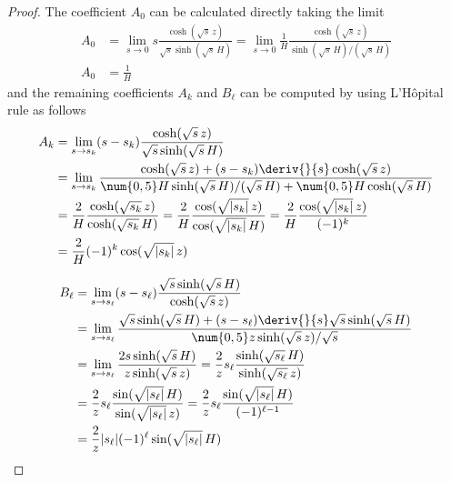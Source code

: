 \begin{proof}
	The coefficient $A_{0}$ can be calculated directly taking the limit
	\begin{subequations}
		\begin{align}
			A_{0} &= \lim_{s \to 0} s
			\frac{
				\cosh(\sqrt{s}\, z)
			}{
				\sqrt{s} \sinh(\sqrt{s}\, H)
			}
			= \lim_{s \to 0} \frac{1}{H}
			\frac{
				\cosh(\sqrt{s}\, z)
			}{
				\sinh(\sqrt{s}\, H)/(\sqrt{s}\, H)
			}
			\\
			A_{0} &= \frac{1}{H}
		\end{align}
	\end{subequations}
	and the remaining coefficients $A_{k}$ and $B_{\ell}$ can be computed by using L'Hôpital rule as follows
	\begin{subequations}
		\begin{align}
			A_{k} &= \lim_{s \to s_{k}} (s - s_{k})
			\frac{
				\cosh(\sqrt{s}\, z)
			}{
				\sqrt{s} \sinh(\sqrt{s}\, H)
			}
			\\
			&= \lim_{s \to s_{k}}
			\frac{
				\cosh(\sqrt{s}\, z) + (s - s_{k}) \deriv{}{s} \cosh(\sqrt{s}\, z)
			}{
				\num{0,5} H \sinh(\sqrt{s}\, H) / (\sqrt{s}\, H)
				+ \num{0,5} H \cosh(\sqrt{s}\, H)
			}
			\\
			&= \frac{2}{H}
			\frac{
				\cosh(\sqrt{s_{k}}\, z)
			}{
				\cosh(\sqrt{s_{k}}\, H)
			}
			= \frac{2}{H}
			\frac{
				\cos(\sqrt{|s_{k}|}\, z)
			}{
				\cos(\sqrt{|s_{k}|}\, H)
			}
			= \frac{2}{H}
			\frac{
				\cos(\sqrt{|s_{k}|}\, z)
			}{
				(-1)^{k}
			}
			\\
			&= \frac{2}{H} (-1)^{k} \cos(\sqrt{|s_{k}|}\, z)
		\end{align}
	\end{subequations}

	\begin{subequations}
		\begin{align}
			B_{\ell} &= \lim_{s \to s_{\ell}} (s - s_{\ell})
			\frac{
				\sqrt{s} \sinh(\sqrt{s}\, H)
			}{
				\cosh(\sqrt{s}\, z)
			}
			\\
			&= \lim_{s \to s_{\ell}}
			\frac{
				\sqrt{s} \sinh(\sqrt{s}\, H)
				+ (s - s_{\ell}) \deriv{}{s} \sqrt{s} \sinh(\sqrt{s}\, H)
			}{
				\num{0,5}z \sinh(\sqrt{s}\, z) / \sqrt{s}
			}
			\\
			&= \lim_{s \to s_{\ell}}
			\frac{
				2s \sinh(\sqrt{s}\, H)
			}{
				z \sinh(\sqrt{s}\, z)
			}
			= \frac{2}{z} s_{\ell} \frac{
				\sinh(\sqrt{s_{\ell}}\, H)
			}{
				\sinh(\sqrt{s_{\ell}}\, z)
			}
			\\
			&= \frac{2}{z} s_{\ell} \frac{
				\sin(\sqrt{|s_{\ell}|}\, H)
			}{
				\sin(\sqrt{|s_{\ell}|}\, z)
			}
			= \frac{2}{z} s_{\ell} \frac{
				\sin(\sqrt{|s_{\ell}|}\, H)
			}{
				(-1)^{\ell-1}
			}
			\\
			&= \frac{2}{z} |s_{\ell}| (-1)^{\ell} \sin(\sqrt{|s_{\ell}|}\, H)
		\end{align}
	\end{subequations}
\end{proof}